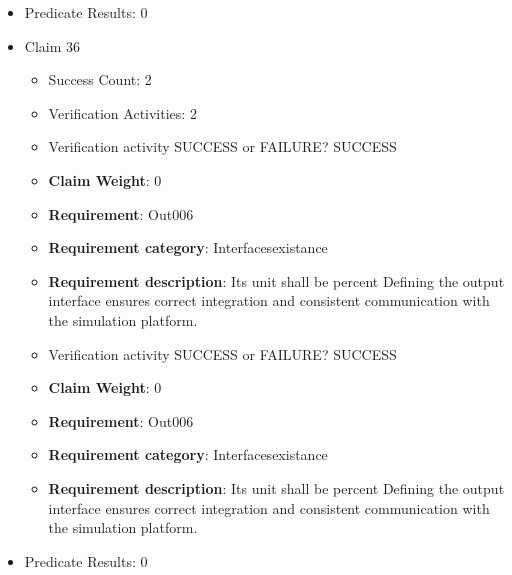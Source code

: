 \documentclass{article}
\begin{document}
\begin{itemize}
\begin{itemize}
					\item Verification activity SUCCESS or FAILURE? SUCCESS
					\item \textbf{Claim Weight}: 0
						\item \textbf{Requirement}: Out005 
						\item \textbf{Requirement category}: Interfacesexistance 
						\item \textbf{Requirement description}: Its unit shall be Nm Defining the output interface ensures correct integration and consistent communication with the simulation platform.
					
				\end{itemize}
				
									    
				\item Predicate Results: 0

  				  \item Claim 36
				\begin{itemize}
			    	\item Success Count: 2 
			    	\item Verification Activities: 2
					\item Verification activity SUCCESS or FAILURE? SUCCESS
					\item \textbf{Claim Weight}: 0
						\item \textbf{Requirement}: Out006 
						\item \textbf{Requirement category}: Interfacesexistance 
						\item \textbf{Requirement description}: Its unit shall be percent Defining the output interface ensures correct integration and consistent communication with the simulation platform.
					
					\item Verification activity SUCCESS or FAILURE? SUCCESS
					\item \textbf{Claim Weight}: 0
						\item \textbf{Requirement}: Out006 
						\item \textbf{Requirement category}: Interfacesexistance 
						\item \textbf{Requirement description}: Its unit shall be percent Defining the output interface ensures correct integration and consistent communication with the simulation platform.
					
				\end{itemize}
				
									    
				\item Predicate Results: 0


\end{itemize}
\end{document}
